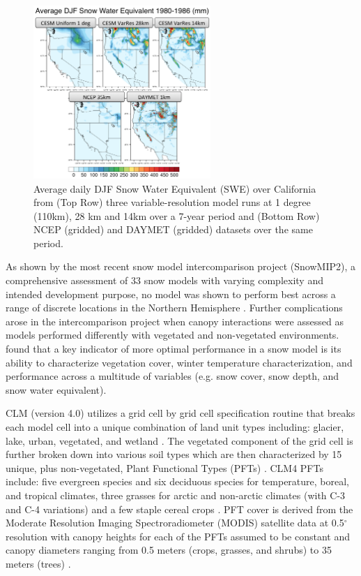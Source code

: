 \documentclass[11pt]{article}
\begin{document}
\begin{figure}
\begin{center}
\includegraphics[width=0.6\textwidth]{VariableResolutionSWE.png}
\end{center}
\caption{Average daily DJF Snow Water Equivalent (SWE) over California from (Top Row) three variable-resolution model runs at 1 degree (110km), 28 km and 14km over a 7-year period and (Bottom Row) NCEP (gridded) and DAYMET (gridded) datasets over the same period.} \label{fig:VarResSWE}
\end{figure}

As shown by the most recent snow model intercomparison project (SnowMIP2), a comprehensive assessment of 33 snow models with varying complexity and intended development purpose, no model was shown to perform best across a range of discrete locations in the Northern Hemisphere \citep{rutter2009SnowMIP2}.  Further complications arose in the intercomparison project when canopy interactions were assessed as models performed differently with vegetated and non-vegetated environments.  \citet{rutter2009SnowMIP2} found that a key indicator of more optimal performance in a snow model is its ability to characterize vegetation cover, winter temperature characterization, and performance across a multitude of variables (e.g. snow cover, snow depth, and snow water equivalent).
    
CLM (version 4.0) utilizes a grid cell by grid cell specification routine that breaks each model cell into a unique combination of land unit types including: glacier, lake, urban, vegetated, and wetland \citep{lawrence2011parameterization}.  The vegetated component of the grid cell is further broken down into various soil types which are then characterized by 15 unique, plus non-vegetated, Plant Functional Types (PFTs) \citep{lawrence2011parameterization}. CLM4 PFTs include: five evergreen species and six deciduous species for temperature, boreal, and tropical climates, three grasses for arctic and non-arctic climates (with C-3 and C-4 variations) and a few staple cereal crops \citep{lawrence2011parameterization}.  PFT cover is derived from the Moderate Resolution Imaging Spectroradiometer (MODIS) satellite data at 0.5$^\circ$ resolution with canopy heights for each of the PFTs assumed to be constant and canopy diameters ranging from 0.5 meters (crops, grasses, and shrubs) to 35 meters (trees) \citep{lawrence2011parameterization}.  
\end{document}
